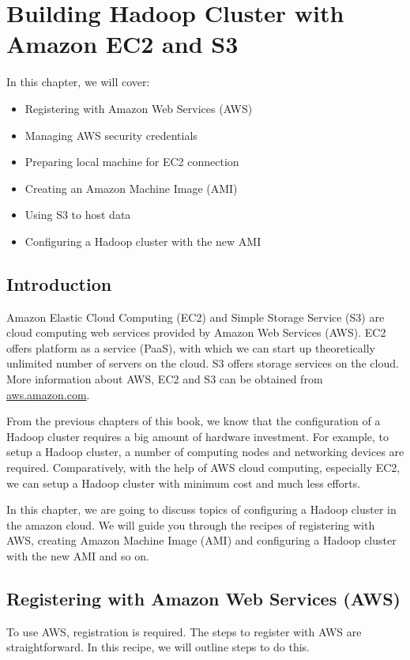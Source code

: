 \chapter{Building Hadoop Cluster with Amazon EC2 and S3}\label{chap:8}

In this chapter, we will cover:
\begin{itemize}
  \item Registering with Amazon Web Services (AWS)
  \item Managing AWS security credentials
  \item Preparing local machine for EC2 connection
  \item Creating an Amazon Machine Image (AMI)
  \item Using S3 to host data
  \item Configuring a Hadoop cluster with the new AMI
\end{itemize}
\section{Introduction}
Amazon Elastic Cloud Computing (EC2) and Simple Storage Service (S3) are cloud computing web services provided by Amazon Web Services (AWS). EC2 offers platform as a service (PaaS), with which we can start up theoretically unlimited number of servers on the cloud. S3 offers storage services on the cloud. More information about AWS, EC2 and S3 can be obtained from \url{aws.amazon.com}.

From the previous chapters of this book, we know that the configuration of a Hadoop cluster requires a big amount of hardware investment. For example, to setup a Hadoop cluster, a number of computing nodes and networking devices are required. Comparatively, with the help of AWS cloud computing, especially EC2, we can setup a Hadoop cluster with minimum cost and much less efforts.

In this chapter, we are going to discuss topics of configuring a Hadoop cluster in the amazon cloud. We will guide you through the recipes of registering with AWS, creating Amazon Machine Image (AMI) and configuring a Hadoop cluster with the new AMI and so on.
\section{Registering with Amazon Web Services (AWS)}
To use AWS, registration is required. The steps to register with AWS are straightforward. In this recipe, we will outline steps to do this.
